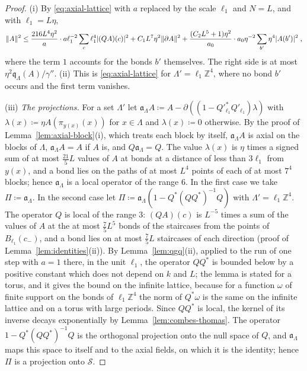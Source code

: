 \documentclass[11pt]{preprint}
\DeclarePairedDelimiter{\abs}{\lvert}{\rvert}
\DeclarePairedDelimiter{\norm}{\lVert}{\rVert}
\numberwithin{equation}{section}
\theoremstyle{definition}
\theoremstyle{remark}
\theoremstyle{plain}
\begin{document}
\begin{proof}
(i) By \eqref{eq:axial-lattice} with $a$ replaced by the scale $\ell_1$ and $N = L$, and with $\ell_1 = L\eta$,
\begin{equation}\label{eq:first-scale-form-proof}
    \norm A^2 \leq \frac{216L^4\eta^2}{a} \cdot a\ell_1^{-2}\sum_c\ell_1^4\abs{(QA)(c)}^2 + C_1L^7\eta^2\norm{\partial A}^2 + \frac{(C_2L^5 + 1)\eta^2}{a_0} \cdot a_0\eta^{-2}\sum_{b'}\eta^4\abs{A(b')}^2\;,
\end{equation}
where the term $1$ accounts for the bonds $b'$ themselves. The right side is at most $\eta^2\mathfrak q_\Lambda(A)/\gamma''$. (ii) This is \eqref{eq:axial-lattice} for $\Lambda' = \ell_1\mathbb Z^4$, where no bond $b'$ occurs and the first term vanishes.

(iii) \emph{The projections.} For a set $\Lambda'$ let $\mathfrak a_\Lambda A \coloneqq A - \partial((1 - Q'^*_{\ell_1}Q'_{\ell_1})\lambda)$ with $\lambda(x) \coloneqq \eta A(\pi_{y(x)}(x))$ for $x \in \Lambda$ and $\lambda(x) \coloneqq 0$ otherwise. By the proof of Lemma~\ref{lem:axial-block}(i), which treats each block by itself, $\mathfrak a_\Lambda A$ is axial on the blocks of $\Lambda$, $\mathfrak a_\Lambda A = A$ if $A$ is, and $Q\mathfrak a_\Lambda = Q$. The value $\lambda(x)$ is $\eta$ times a signed sum of at most $\frac{21}{5}L$ values of $A$ at bonds at a distance of less than $3\ell_1$ from $y(x)$, and a bond lies on the paths of at most $L^4$ points of each of at most $7^4$ blocks; hence $\mathfrak a_\Lambda$ is a local operator of the range $6$. In the first case we take $\Pi \coloneqq \mathfrak a_\Lambda$. In the second case let $\Pi \coloneqq \mathfrak a_\Lambda(1 - Q^*(QQ^*)^{-1}Q)$ with $\Lambda' = \ell_1\mathbb Z^4$. The operator $Q$ is local of the range $3$: $(QA)(c)$ is $L^{-5}$ times a sum of the values of $A$ at the at most $\frac75L^5$ bonds of the staircases from the points of $B_{\ell_1}(c_-)$, and a bond lies on at most $\frac75L$ staircases of each direction (proof of Lemma~\ref{lem:identities}(ii)). By Lemma~\ref{lem:qgq}(ii), applied to the run of one step with $a = 1$ there, in the unit $\ell_1$, the operator $QQ^*$ is bounded below by a positive constant which does not depend on $k$ and $L$; the lemma is stated for a torus, and it gives the bound on the infinite lattice, because for a function $\omega$ of finite support on the bonds of $\ell_1\mathbb Z^4$ the norm of $Q^*\omega$ is the same on the infinite lattice and on a torus with large periods. Since $QQ^*$ is local, the kernel of its inverse decays exponentially by Lemma~\ref{lem:combes-thomas}. The operator $1 - Q^*(QQ^*)^{-1}Q$ is the orthogonal projection onto the null space of $Q$, and $\mathfrak a_\Lambda$ maps this space to itself and to the axial fields, on which it is the identity; hence $\Pi$ is a projection onto $\mathcal S$.


\end{proof}
\end{document}
